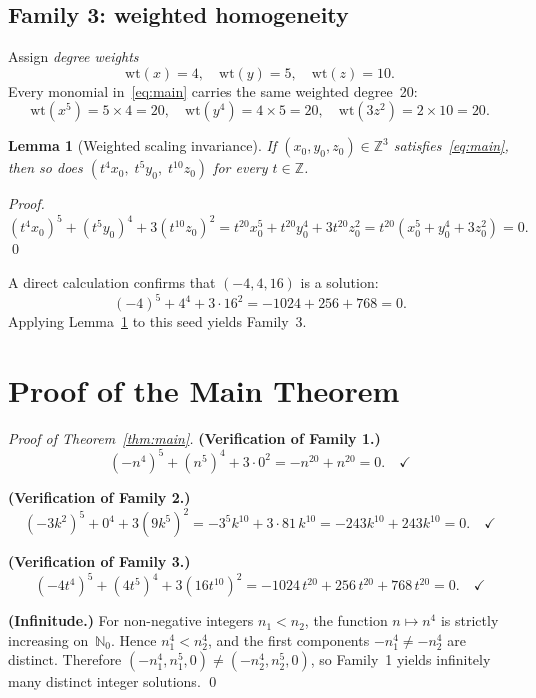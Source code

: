 \documentclass[12pt,a4paper]{article}
\newtheorem{lemma}[theorem]{Lemma}
\theoremstyle{definition}
\newcommand{\Z}{\mathbb{Z}}
\newcommand{\N}{\mathbb{N}}
\begin{document}
\subsection{Family 3: weighted homogeneity}

Assign \emph{degree weights}
\[
  \mathrm{wt}(x) = 4, \quad \mathrm{wt}(y) = 5, \quad \mathrm{wt}(z) = 10.
\]
Every monomial in~\eqref{eq:main} carries the same weighted degree~20:
\[
  \mathrm{wt}(x^5) = 5 \times 4 = 20, \quad
  \mathrm{wt}(y^4) = 4 \times 5 = 20, \quad
  \mathrm{wt}(3z^2) = 2 \times 10 = 20.
\]

\begin{lemma}[Weighted scaling invariance]\label{lem:scale}
  If $(x_0, y_0, z_0) \in \Z^3$ satisfies~\eqref{eq:main}, then so does
  $(t^4 x_0,\; t^5 y_0,\; t^{10} z_0)$ for every $t \in \Z$.
\end{lemma}

\begin{proof}
  $(t^4 x_0)^5 + (t^5 y_0)^4 + 3(t^{10}z_0)^2
  = t^{20} x_0^5 + t^{20} y_0^4 + 3t^{20} z_0^2
  = t^{20}(x_0^5 + y_0^4 + 3z_0^2) = 0.$ \qed
\end{proof}

A direct calculation confirms that $(-4, 4, 16)$ is a solution:
\[
  (-4)^5 + 4^4 + 3\cdot 16^2 = -1024 + 256 + 768 = 0.
\]
Applying Lemma~\ref{lem:scale} to this seed yields Family~3.

\section{Proof of the Main Theorem}\label{sec:proof}

\begin{proof}[Proof of Theorem~\ref{thm:main}]
  \textbf{(Verification of Family 1.)}
  \[
    (-n^4)^5 + (n^5)^4 + 3\cdot 0^2 = -n^{20} + n^{20} = 0.\quad\checkmark
  \]

  \textbf{(Verification of Family 2.)}
  \[
    (-3k^2)^5 + 0^4 + 3(9k^5)^2 = -3^5 k^{10} + 3\cdot 81\, k^{10}
    = -243k^{10} + 243k^{10} = 0.\quad\checkmark
  \]

  \textbf{(Verification of Family 3.)}
  \[
    (-4t^4)^5 + (4t^5)^4 + 3(16t^{10})^2 = -1024\,t^{20} + 256\,t^{20} + 768\,t^{20}
    = 0.\quad\checkmark
  \]

  \textbf{(Infinitude.)}  For non-negative integers $n_1 < n_2$, the function
  $n \mapsto n^4$ is strictly increasing on~$\N_0$.  Hence $n_1^4 < n_2^4$, and
  the first components $-n_1^4 \neq -n_2^4$ are distinct.  Therefore
  $(-n_1^4, n_1^5, 0) \neq (-n_2^4, n_2^5, 0)$, so Family~1 yields infinitely
  many distinct integer solutions.
  \qed
\end{proof}
\end{document}
